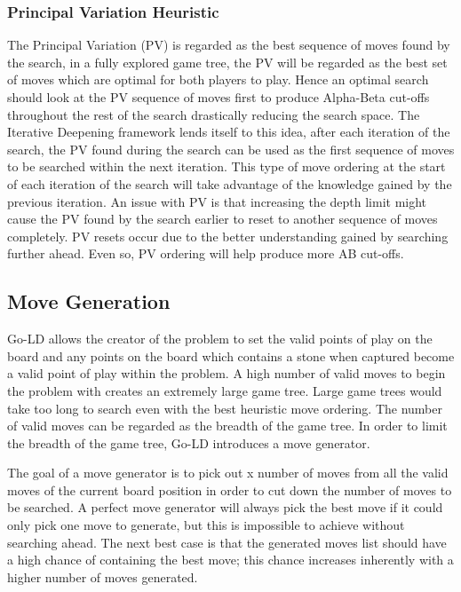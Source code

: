 \documentclass{l4proj}
\begin{document}
\subsubsection{Principal Variation Heuristic}
The Principal Variation (PV) is regarded as the best sequence of moves found by the search, in a fully explored game tree, the PV will be regarded as the best set of moves which are optimal for both players to play. Hence an optimal search should look at the PV sequence of moves first to produce Alpha-Beta cut-offs throughout the rest of the search drastically reducing the search space. The Iterative Deepening framework lends itself to this idea, after each iteration of the search, the PV found during the search can be used as the first sequence of moves to be searched within the next iteration. This type of move ordering at the start of each iteration of the search will take advantage of the knowledge gained by the previous iteration. An issue with PV is that increasing the depth limit might cause the PV found by the search earlier to reset to another sequence of moves completely. PV resets occur due to the better understanding gained by searching further ahead. Even so, PV ordering will help produce more AB cut-offs.

\subsection{Move Generation}
Go-LD allows the creator of the problem to set the valid points of play on the board and any points on the board which contains a stone when captured become a valid point of play within the problem. A high number of valid moves to begin the problem with creates an extremely large game tree. Large game trees would take too long to search even with the best heuristic move ordering. The number of valid moves can be regarded as the breadth of the game tree. In order to limit the breadth of the game tree, Go-LD introduces a move generator.

The goal of a move generator is to pick out x number of moves from all the valid moves of the current board position in order to cut down the number of moves to be searched. A perfect move generator will always pick the best move if it could only pick one move to generate, but this is impossible to achieve without searching ahead.  The next best case is that the generated moves list should have a high chance of containing the best move; this chance increases inherently with a higher number of moves generated.
\end{document}
